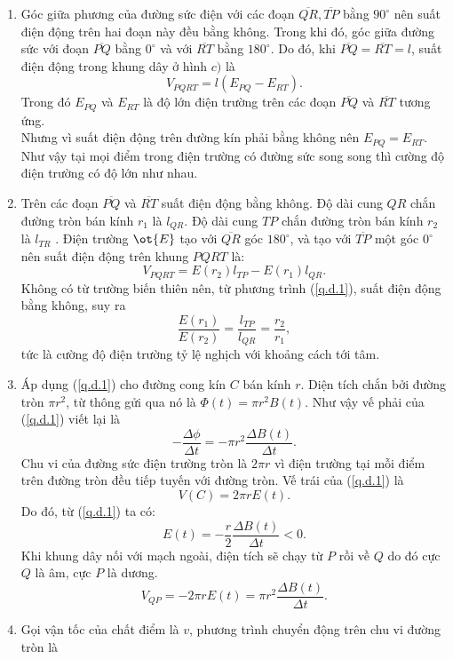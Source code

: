 \begin{loigiai}
\begin{enumerate}[1)]
    \item Góc giữa phương của đường sức điện với các đoạn $\overline{QR}, \overline{TP}$  bằng ${{90}^{\circ}}$ nên suất điện động trên hai đoạn này đều bằng không. Trong khi đó, góc giữa đường sức với đoạn $\overline{PQ}$ bằng $0^\circ$ và với $\overline{RT}$ bằng $180^\circ$. Do đó, khi  $\overline{PQ}=\overline{RT}=l$, suất điện động trong khung dây ở hình $c)$ là
    \[{{V}_{PQRT}} = l\left( {{E}_{PQ}}-{{E}_{RT}} \right).\]
    Trong đó ${{E}_{PQ}}$ và ${{E}_{RT}}$ là độ lớn điện trường trên các đoạn $\overline{PQ}$ và $\overline{RT}$ tương ứng.\\ Nhưng vì suất điện động trên đường kín phải bằng không nên ${{E}_{PQ}} = {{E}_{RT}}$. Như vậy tại mọi điểm trong điện trường có đường sức song song thì cường độ điện trường có độ lớn như nhau.
    \item Trên các đoạn $\overline{PQ}$ và $\overline{RT}$ suất điện động bằng không. Độ dài cung $QR$ chắn đường tròn bán kính ${{r}_{1}}$ là ${{l}_{QR}}$. Độ dài cung $TP$ chắn đường tròn bán kính ${{r}_{2}}$ là ${{l}_{TR}}$ . Điện trường $\ot{E}$ tạo với $\overline{QR}$ góc $180^\circ$, và tạo với $\overline{TP}$ một góc $0^\circ$ nên suất điện động trên khung $PQRT$ là:
    \[{{V}_{PQRT}} = E({{r}_{2}}){{l}_{TP}} - E({{r}_{1}}){{l}_{QR}}.\]
    Không có từ trường biến thiên nên, từ phương trình (\ref{q.d.1}), suất điện động bằng không, suy ra \[\dfrac{E({{r}_{1}})}{E({{r}_{2}})}=\dfrac{{{l}_{TP}}}{{{l}_{QR}}} =\dfrac{{{r}_{2}}}{{{r}_{1}}},\] 
    tức là cường độ điện trường tỷ lệ nghịch với khoảng cách tới tâm.
    \item Áp dụng (\ref{q.d.1}) cho đường cong kín $C$ bán kính $r$. Diện tích chắn bởi đường tròn $\pi {{r}^{2}}$, từ thông gửi qua nó là $\Phi (t) = \pi {{r}^{2}}B(t)$. Như vậy vế phải của (\ref{q.d.1}) viết lại là 
    \[-\dfrac{\Delta \phi }{\Delta t}=-\pi {{r}^{2}}\dfrac{\Delta B(t)}{\Delta t}.\]
    Chu vi của đường sức điện trường tròn là $2\pi r$ vì điện trường tại mỗi điểm trên đường tròn đều tiếp tuyến với  đường tròn. Vế trái của (\ref{q.d.1}) là 
    \[V(C)=2\pi rE(t).\]
    Do đó, từ (\ref{q.d.1}) ta có:
    \[E(t) = -\dfrac{r}{2}\dfrac{\Delta B(t)}{\Delta t} < 0.\]  
    Khi khung dây nối với mạch ngoài, điện tích sẽ chạy từ $P$ rồi về $Q$ do đó cực $Q$ là âm, cực $P$ là dương.
    \[{{V}_{QP}} = -2\pi rE(t) = \pi {{r}^{2}}\dfrac{\Delta B(t)}{\Delta t}.\]
    \item  Gọi vận tốc của chất điểm là $v$, phương trình chuyển động trên chu vi đường tròn là 

\end{enumerate}
\end{loigiai}
